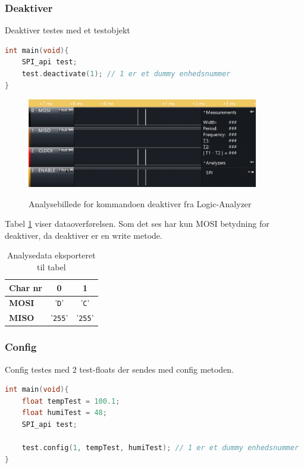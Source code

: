 \subsubsection*{Deaktiver}
Deaktiver testes med et testobjekt

\begin{lstlisting}[language=C]
int main(void){
	SPI_api test;
	test.deactivate(1); // 1 er et dummy enhedsnummer
}
\end{lstlisting}

\begin{figure}[H]
\centering
{\includegraphics[width=0.90\textwidth]{filer/integrationstest/billeder/spi_deactivate}}
\caption{Analysebillede for kommandoen deaktiver fra Logic-Analyzer}
\label{lab:scop_deactivate}
\end{figure}

Tabel \ref{table:scop_deactivate} viser dataoverførelsen. Som det ses har kun MOSI betydning for deaktiver, da deaktiver er en write metode. 

\begin{table}[h]
	\caption{Analysedata eksporteret til tabel}
	\centering
	\begin{tabular}{|l|c|c|}
		\hline 
		\textbf{Char nr} & \textbf{0} & \textbf{1} \\ 		
		\hline 
		\textbf{MOSI} & '\verb+D+' & '\verb+C+' \\ 
		\hline 
		\textbf{MISO} & '\verb+255+' & '\verb+255+' \\ 
		\hline 
	\end{tabular} 
	\label{table:scop_deactivate}
\end{table}


\subsubsection*{Config}
Config testes med 2 test-floats der sendes med config metoden.

\begin{lstlisting}[language=C]
int main(void){
	float tempTest = 100.1;
	float humiTest = 48;
	SPI_api test;
	
	test.config(1, tempTest, humiTest); // 1 er et dummy enhedsnummer
}
\end{lstlisting}



